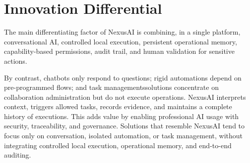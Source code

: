 \section{Innovation Differential}

The main differentiating factor of NexusAI is combining, in a single platform, conversational AI, controlled local execution, persistent operational memory, capability-based permissions, audit trail, and human validation for sensitive actions.

By contrast, chatbots only respond to questions; rigid automations depend on pre-programmed flows; and task managementssolutions concentrate on collaboration administration but do not execute operations. NexusAI interprets context, triggers allowed tasks, records evidence, and maintains a complete history of executions. This adds value by enabling professional AI usage with security, traceability, and governance. Solutions that resemble NexusAI tend to focus only on conversation, isolated automation, or task management, without integrating controlled local execution, operational memory, and end-to-end auditing.
